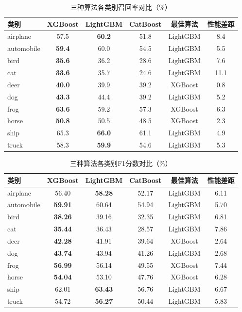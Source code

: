 \documentclass[UTF8]{report}
\theoremstyle{MyLineTheoremStyle} %
\theoremstyle{MyBlockTheoremStyle} %
\theoremstyle{MySubsubsectionStyle} %
\begin{document}
\begin{table}[H]
    \centering
    \caption{三种算法各类别召回率对比（\%）}
    \begin{tabular}{lccccc}
        \toprule
        类别 & XGBoost & LightGBM & CatBoost & 最佳算法 & 性能差距 \\ \midrule
        airplane & 57.5 & \textbf{60.2} & 51.8 & LightGBM & 8.4 \\
        automobile & \textbf{59.4} & 60.0 & 54.5 & LightGBM & 5.5 \\
        bird & \textbf{35.6} & 36.2 & 28.6 & LightGBM & 7.6 \\
        cat & \textbf{33.6} & 35.7 & 24.6 & LightGBM & 11.1 \\
        deer & \textbf{40.0} & 39.9 & 39.2 & XGBoost & 0.8 \\
        dog & \textbf{43.3} & 44.4 & 39.2 & LightGBM & 5.2 \\
        frog & \textbf{63.6} & 59.2 & 57.3 & XGBoost & 6.3 \\
        horse & \textbf{50.8} & 50.5 & 48.5 & XGBoost & 2.3 \\
        ship & 65.3 & \textbf{66.0} & 61.1 & LightGBM & 4.9 \\
        truck & 58.3 & \textbf{59.9} & 54.6 & LightGBM & 5.3 \\ \bottomrule
    \end{tabular}
\end{table}

\begin{table}[H]
    \centering
    \caption{三种算法各类别F1分数对比（\%）}
    \begin{tabular}{lccccc}
        \toprule
        类别 & XGBoost & LightGBM & CatBoost & 最佳算法 & 性能差距 \\ \midrule
        airplane & 56.40 & \textbf{58.28} & 52.17 & LightGBM & 6.11 \\
        automobile & \textbf{59.91} & 60.64 & 54.94 & LightGBM & 5.70 \\
        bird & \textbf{38.26} & 39.16 & 32.35 & LightGBM & 6.81 \\
        cat & \textbf{35.44} & 36.43 & 28.57 & LightGBM & 7.86 \\
        deer & \textbf{42.28} & 41.91 & 39.64 & XGBoost & 2.64 \\
        dog & \textbf{43.74} & 43.94 & 41.26 & LightGBM & 2.68 \\
        frog & \textbf{56.99} & 56.14 & 49.55 & XGBoost & 7.44 \\
        horse & \textbf{54.04} & 53.10 & 47.76 & XGBoost & 6.28 \\
        ship & 62.01 & \textbf{63.43} & 56.76 & LightGBM & 6.67 \\
        truck & 54.72 & \textbf{56.27} & 50.44 & LightGBM & 5.83 \\ \bottomrule
    \end{tabular}
\end{table}
\end{document}
